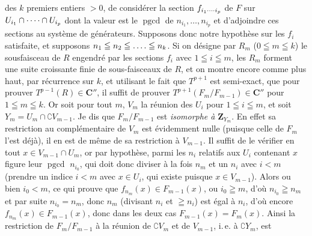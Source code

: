 des $k$ premiers entiers $>0$, de considérer la section
$f_{i_1\mathinner{\cdotp\cdotp\cdotp\cdotp}i_p}$ de $F$ sur $U_{i_1}\cap\mathinner{\cdotp\cdotp\cdotp\cdotp}\cap U_{i_p}$ dont la valeur
est le $\operatorname{pgcd}$ de $n_{i_1},\ldots,n_{i_p}$ et d'adjoindre ces
sections au système de générateurs.
Supposons donc notre hypothèse sur les $f_i$ satisfaite, et supposons
$n_1\leqq n_2\leqq\mathinner{.\,.\,.\,.}\leqq n_k$. Si on désigne par $R_m$ ($0\leqq m\leqq k$)
le sousfaisceau de $R$ engendré par les sections $f_i$ avec
$1\leqq i\leqq m$, les $R_m$ forment une suite croissante finie de
sous-faisceaux de $R$,
et on montre encore comme plus haut, par récurrence sur $k$, et utilisant le
fait que $T^{p+1}$ est semi-exact, que pour prouver $T^{p-1}(R)\in \mathbf C''$, il
suffit de prouver $T^{p+1}(F_m/F_{m-1})\in \mathbf C''$ pour $1\leqq m\leqq k$.
Or soit pour tout $m$, $V_m$ la réunion des $U_i$ pour $1\leqq i\leqq m$, et
soit
$Y_m=U_m\cap \complement V_{m-1}$.
Je dis que $F_m/F_{m-1}$ est \textit{isomorphe à} $\mathbf Z_{Y_m}$.
En effet sa restriction au complémentaire de $V_m$ est évidemment nulle
(puisque celle de $F_m$ l'est déjà), il en est de même de sa restriction à
$V_{m-1}$. Il suffit de le vérifier en tout $x\in V_{m-1}\cap U_m$, or par
hypothèse, parmi les $n_i$ relatifs aux $U_i$ contenant $x$ figure leur
$\operatorname{pgcd}$ $n_{i_0}$, qui doit donc diviser à la fois $n_m$ et un
$n_i$ avec $i<m$ (prendre un indice $i<m$ avec $x\in U_i$, qui existe puisque
$x\in V_{m-1}$). Alors ou bien $i_0<m$, ce qui prouve que
$f_{n_m}(x)\in F_{m-1}(x)$, ou $i_0\geqq m$, d'où $n_{i_0}\geqq n_m$ et par
suite $n_{i_0}=n_m$, donc $n_m$ (divisant $n_i$ et $\geqq n_i$) est égal à
$n_i$, d'où encore $f_{n_m}(x)\in F_{m-1}(x)$, donc dans les deux cas
$F_{m-1}(x)=F_m(x)$. Ainsi la restriction de $F_m/F_{m-1}$ à la réunion de
$\complement V_m$ et de $V_{m-1}$, i.\,e. à $\complement Y_m$, est

